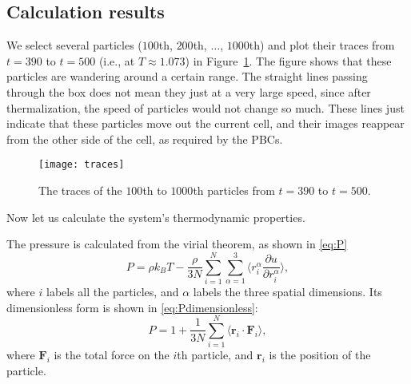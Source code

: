 \subsection{Calculation results}

We select several particles ($100$th, $200$th, $\ldots$, $1000$th) and plot their traces
from $t = 390$ to $t = 500$ (i.e., at $T \approx 1.073$) in Figure~\ref{fig:traces}.
The figure shows that these particles are wandering around a certain
range. The straight lines passing through the box does not mean they just at a very
large speed, since after thermalization, the speed of particles would not change so
much. These lines just indicate that these particles move out the current cell,
and their images reappear from the other side of the cell, as required by the PBCs.

\begin{figure}
    \centering
    \texttt{[image: traces]}
    \caption{The traces of the $100$th to $1000$th particles from $t = 390$ to $t = 500$.}
    \label{fig:traces}
\end{figure}

Now let us calculate the  system's thermodynamic properties.

The pressure is calculated from the virial theorem, as shown in \eqref{eq:P}
%
\begin{equation}\label{eq:P}
    P = \rho k_B T - \frac{ \rho }{ 3N } \sum_{i=1}^{N} \sum_{\alpha=1}^{3}
    \biggl \langle r_i^\alpha \frac{ \partial u }{ \partial r_i^\alpha } \biggr \rangle,
\end{equation}
%
where $i$ labels all the particles, and $\alpha$ labels the three spatial dimensions.
Its dimensionless form is shown in \eqref{eq:Pdimensionless}\cite{thijssen_2007}:
%
\begin{equation}\label{eq:Pdimensionless}
    P = 1 + \frac{ 1 }{ 3N } \sum_{i=1}^{N}
    \langle \bm{r}_i \cdot \bm{F}_i \rangle,
\end{equation}
%
where $\bm{F}_i$ is the total force on the $i$th particle, and $\bm{r}_i$ is the
position of the particle.


